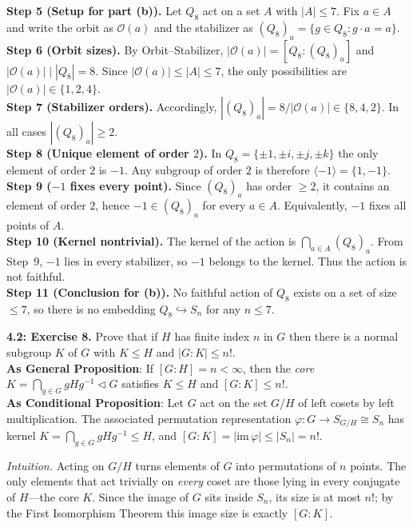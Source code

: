 \documentclass[11pt]{article}
\theoremstyle{definition}
\begin{document}
\textbf{Step 5 (Setup for part (b)).} Let $Q_8$ act on a set $A$ with $|A|\le 7$. Fix $a\in A$ and write the orbit as $\mathcal O(a)$ and the stabilizer as $(Q_8)_a=\{g\in Q_8: g\cdot a=a\}$.\\
\textbf{Step 6 (Orbit sizes).} By Orbit–Stabilizer, $|\mathcal O(a)|=[Q_8:(Q_8)_a]$ and $|\mathcal O(a)|\mid |Q_8|=8$. Since $|\mathcal O(a)|\le |A|\le 7$, the only possibilities are $|\mathcal O(a)|\in\{1,2,4\}$.\\
\textbf{Step 7 (Stabilizer orders).} Accordingly, $|(Q_8)_a|=8/|\mathcal O(a)|\in\{8,4,2\}$. In all cases $|(Q_8)_a|\ge 2$.\\
\textbf{Step 8 (Unique element of order $2$).} In $Q_8=\{\pm1,\pm i,\pm j,\pm k\}$ the only element of order $2$ is $-1$. Any subgroup of order $2$ is therefore $\langle -1\rangle=\{1,-1\}$.\\
\textbf{Step 9 ($-1$ fixes every point).} Since $(Q_8)_a$ has order $\ge 2$, it contains an element of order $2$, hence $-1\in (Q_8)_a$ for every $a\in A$. Equivalently, $-1$ fixes all points of $A$.\\
\textbf{Step 10 (Kernel nontrivial).} The kernel of the action is $\bigcap_{a\in A}(Q_8)_a$. From Step~9, $-1$ lies in every stabilizer, so $-1$ belongs to the kernel. Thus the action is not faithful.\\
\textbf{Step 11 (Conclusion for (b)).} No faithful action of $Q_8$ exists on a set of size $\le 7$, so there is no embedding $Q_8\hookrightarrow S_n$ for any $n\le 7$.\\

\newpage

\noindent \textbf{4.2: Exercise 8.} Prove that if $H$ has finite index $n$ in $G$ then there is a normal subgroup $K$ of $G$ with $K\le H$ and $|G:K|\le n!$.\\ %

\noindent\textbf{As General Proposition}: If $[G:H]=n<\infty$, then the \emph{core} $K=\bigcap_{g\in G} gHg^{-1}\lhd G$ satisfies $K\le H$ and $[G:K]\le n!$.\\

\noindent\textbf{As Conditional Proposition}: Let $G$ act on the set $G/H$ of left cosets by left multiplication. The associated permutation representation $\varphi:G\to S_{G/H}\cong S_n$ has kernel $K=\bigcap_{g\in G} gHg^{-1}\le H$, and $[G:K]=|\mathrm{im}\,\varphi|\le |S_n|=n!$.

\newpage

\dotfill

\emph{Intuition.} Acting on $G/H$ turns elements of $G$ into permutations of $n$ points. The only elements that act trivially on \emph{every} coset are those lying in every conjugate of $H$—the core $K$. Since the image of $G$ sits inside $S_n$, its size is at most $n!$; by the First Isomorphism Theorem this image size is exactly $[G:K]$.\\
\end{document}
